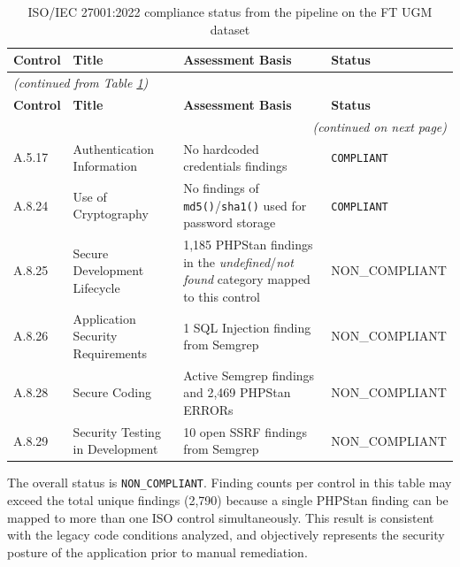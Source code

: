 \begin{longtable}{|l|>{\raggedright\arraybackslash}p{2.5cm}|p{6cm}|p{3cm}|}
\caption{ISO/IEC 27001:2022 compliance status from the pipeline on the FT UGM dataset}
\label{tab:iso-status} \\
\hline
\textbf{Control} & \textbf{Title} & \textbf{Assessment Basis} & \textbf{Status} \\
\hline \hline
\endfirsthead

\multicolumn{4}{l}{\textit{(continued from Table \ref{tab:iso-status})}} \\
\hline
\textbf{Control} & \textbf{Title} & \textbf{Assessment Basis} & \textbf{Status} \\
\hline \hline
\endhead

\hline
\multicolumn{4}{r}{\textit{(continued on next page)}} \\
\endfoot

\hline
\endlastfoot

A.5.17 & Authentication Information &
No hardcoded credentials findings &
\texttt{COMPLIANT} \\
\hline

A.8.24 & Use of Cryptography &
No findings of \texttt{md5()}/\texttt{sha1()} used for password storage &
\texttt{COMPLIANT} \\
\hline

A.8.25 & Secure Development Lifecycle &
1,185 PHPStan findings in the \textit{undefined}/\textit{not found}
category mapped to this control &
{\footnotesize\ttfamily NON\_COMPLIANT} \\
\hline

A.8.26 & Application Security Requirements &
1 SQL Injection finding from Semgrep &
{\footnotesize\ttfamily NON\_COMPLIANT} \\
\hline

A.8.28 & Secure Coding &
Active Semgrep findings and 2,469 PHPStan ERRORs &
{\footnotesize\ttfamily NON\_COMPLIANT} \\
\hline

A.8.29 & Security Testing in Development &
\begin{minipage}[t]{6cm}10 open SSRF findings from Semgrep\end{minipage} &
{\footnotesize\ttfamily NON\_COMPLIANT} \\
\end{longtable}

The overall status is \texttt{NON\_COMPLIANT}. Finding counts per control in this table may exceed the total unique findings (2,790) because a single PHPStan finding can be mapped to more than one ISO control simultaneously. This result is consistent with the legacy code conditions analyzed, and objectively represents the security posture of the application prior to manual remediation.

